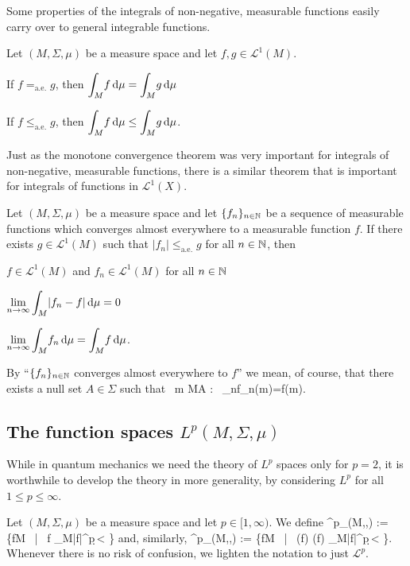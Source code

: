 Some properties of the integrals of non-negative, measurable functions easily carry over to general integrable functions.

\bl
Let $(M,\Sigma,\mu)$ be a measure space and let $f,g \in \mathscr{L}^1(M)$. 
\ben[label=(\roman*)]
\item If $f=_{\mathrm{a.e.}}g$, then $\displaystyle \int_M\! f \, \mathrm{d} \mu = \int_M\! g \, \mathrm{d} \mu$
\item If $f\leq_{\mathrm{a.e.}}g$, then $\displaystyle \int_M\! f \, \mathrm{d} \mu \leq \int_M\! g \, \mathrm{d} \mu$.
\een
\el

Just as the monotone convergence theorem was very important for integrals of non-negative, measurable functions, there is a similar theorem that is important for integrals of functions in $\mathscr{L}^1(X)$.

Let $(M,\Sigma,\mu)$ be a measure space and let $\{f_n\}_{n\in\mathbb{N}}$ be a sequence of measurable functions which converges almost everywhere to a measurable function $f$. If there exists $g \in \mathscr{L}^1(M)$ such that $|f_n| \leq_{\mathrm{a.e.}} g$ for all $n \in \mathbb{N}$, then
\ben[label=(\roman*)]
\item $f \in \mathscr{L}^1(M)$ and $f_n \in \mathscr{L}^1(M)$ for all $n \in \mathbb{N}$
\item $\displaystyle \lim_{n \to \infty} \int_M \!  |f_n-f| \, \mathrm{d} \mu =0$
\item $\displaystyle \lim_{n \to \infty} \int_M \!  f_n \, \mathrm{d} \mu = \int_M \!  f \, \mathrm{d} \mu$.
\een
\et

\br
By ``$\{f_n\}_{n\in\mathbb{N}}$ converges almost everywhere to $f$'' we mean, of course, that there exists a null set $A\in\Sigma$ such that
\bse
\forall \, m \in M\setminus A : \ \lim_{n\to\infty}f_n(m)=f(m).
\ese
\er


\subsection[\texorpdfstring{The function spaces $L^p(M,\Sigma,\mu)$}{The function spaces L\textasciicircum p(M,\textSigma,\textmu)}]{The function spaces $L^p(M,\Sigma,\mu)$}


While in quantum mechanics we need the theory of $L^p$ spaces only for $p=2$, it is worthwhile to develop the theory in more generality, by considering $L^p$ for all $1\leq p\leq \infty$.

\bd
Let $(M,\Sigma,\mu)$ be a measure space and let $p\in [1,\infty)$. We define
\bse
{}^p_{\R}(M,\Sigma,\mu) := \biggl\{f\cl M \to \overline{\R}\ \Big| \ f  \int_M\!|f|^p\,\d \mu < \infty\biggr\}
\ese
and, similarly,
\bse
{}^p_{\C}(M,\Sigma,\mu) := \biggl\{f\cl M \to \C\ \Big| \ \Re(f)  \Im(f)  \int_M\!|f|^p\,\d \mu < \infty\biggr\}.
\ese
Whenever there is no risk of confusion, we lighten the notation to just $\mathscr{L}^p$.
\ed


